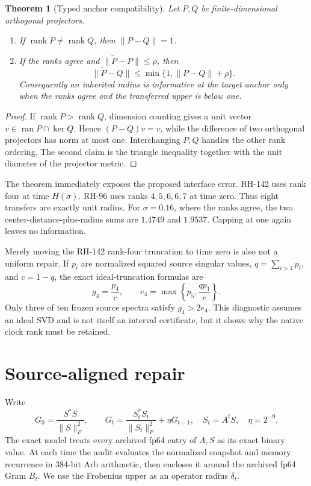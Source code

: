 \documentclass[12pt]{article}
\newtheorem{theorem}{Theorem}
\begin{document}
\begin{theorem}[Typed anchor compatibility]\label{thm:typed}
Let $P,Q$ be finite-dimensional orthogonal projectors.
\begin{enumerate}
\item If $\operatorname{rank}P\ne\operatorname{rank}Q$, then
      $\|P-Q\|=1$.
\item If the ranks agree and $\|\widetilde P-P\|\leq\rho$, then
\[
 \|\widetilde P-Q\|\leq
 \min\{1,\|P-Q\|+\rho\}.
\]
Consequently an inherited radius is informative at the target anchor only
when the ranks agree and the transferred upper is below one.
\end{enumerate}
\end{theorem}
\begin{proof}
If $\operatorname{rank}P>\operatorname{rank}Q$, dimension counting gives a
unit vector $v\in\operatorname{ran}P\cap\ker Q$.  Hence
$(P-Q)v=v$, while the difference of two orthogonal projectors has norm at
most one.  Interchanging $P,Q$ handles the other rank ordering.  The second
claim is the triangle inequality together with the unit diameter of the
projector metric.
\end{proof}

The theorem immediately exposes the proposed interface error.  RH-142 uses
rank four at time $H(\sigma)$.  RH-96 uses ranks $4,5,6,6,7$ at time zero.
Thus eight transfers are exactly unit radius.  For $\sigma=0.16$, where the
ranks agree, the two center-distance-plus-radius sums are $1.4749$ and
$1.9537$.  Capping at one again leaves no information.

Merely moving the RH-142 rank-four truncation to time zero is also not a
uniform repair.  If $p_i$ are normalized squared source singular values,
$q=\sum_{i>4}p_i$, and $c=1-q$, the exact ideal-truncation formulas are
\[
 g_4=\frac{p_4}{c},\qquad
 e_4=\max\!\left\{p_5,\frac{q p_1}{c}\right\}.
\]
Only three of ten frozen source spectra satisfy $g_4>2e_4$.  This diagnostic
assumes an ideal SVD and is not itself an interval certificate, but it shows
why the native clock rank must be retained.

\section{Source-aligned repair}
Write
\[
 G_0=\frac{S^*S}{\|S\|_F^2},\qquad
 G_t=\frac{S_t^*S_t}{\|S_t\|_F^2}+\eta G_{t-1},
 \quad S_t=A^tS,\quad \eta=2^{-9}.
\]
The exact model treats every archived fp64 entry of $A,S$ as its exact binary
value.  At each time the audit evaluates the normalized snapshot and memory
recurrence in 384-bit Arb arithmetic, then encloses it around the archived
fp64 Gram $B_t$.  We use the Frobenius upper as an operator radius
$\delta_t$.
\end{document}
